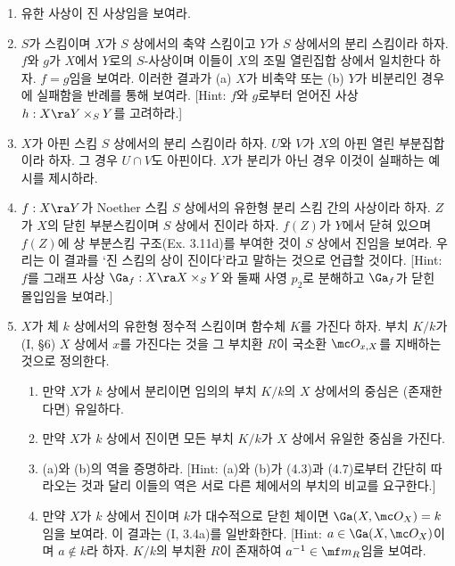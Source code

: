 	\begin{enumerate}[label=\tb{4.\arabic*.},itemindent=0mm,itemsep=2mm]
	\item 유한 사상이 진 사상임을 보여라.
	\item $S$가 스킴이며 $X$가 $S$ 상에서의 축약 스킴이고 $Y$가 $S$ 상에서의 분리 스킴이라 하자.
	$f$와 $g$가 $X$에서 $Y$로의 $S$-사상이며 이들이 $X$의 조밀 열린집합 상에서 일치한다 하자. $f=g$임을 보여라.
	이러한 결과가 (a) $X$가 비축약 또는 (b) $Y$가 비분리인 경우에 실패함을 반례를 통해 보여라.
	[Hint: $f$와 $g$로부터 얻어진 사상 $h:X\ra Y\times_SY$를 고려하라.]
	\item $X$가 아핀 스킴 $S$ 상에서의 분리 스킴이라 하자. $U$와 $V$가 $X$의 아핀 열린 부분집합이라 하자.
	그 경우 $U\cap V$도 아핀이다. $X$가 분리가 아닌 경우 이것이 실패하는 예시를 제시하라.
	\item $f:X\ra Y$가 Noether 스킴 $S$ 상에서의 유한형 분리 스킴 간의 사상이라 하자.
	$Z$가 $X$의 닫힌 부분스킴이며 $S$ 상에서 진이라 하자.
	$f(Z)$가 $Y$에서 닫혀 있으며 $f(Z)$에 상 부분스킴 구조(Ex. 3.11d)를 부여한 것이 $S$ 상에서 진임을 보여라.
	우리는 이 결과를 `진 스킴의 상이 진이다'라고 말하는 것으로 언급할 것이다.
	[Hint: $f$를 그래프 사상 $\Ga_f:X\ra X\times_SY$와 둘째 사영 $p_2$로 분해하고 $\Ga_f$가 닫힌 몰입임을 보여라.]
	\item $X$가 체 $k$ 상에서의 유한형 정수적 스킴이며 함수체 $K$를 가진다 하자.
	부치 $K/k$가 (I, \S 6) $X$ 상에서  $x$를 가진다는 것을
	그 부치환 $R$이 국소환 $\mc O_{x,X}$를 지배하는 것으로 정의한다.
	\begin{enumerate}[label=(\alph*)]
	\item 만약 $X$가 $k$ 상에서 분리이면 임의의 부치 $K/k$의 $X$ 상에서의 중심은 (존재한다면) 유일하다.
	\item 만약 $X$가 $k$ 상에서 진이면 모든 부치 $K/k$가 $X$ 상에서 유일한 중심을 가진다.
	\end{enumerate}
	\begin{enumerate}[label=*(\alph*)]
	\setcounter{enumii}{2}
	\item (a)와 (b)의 역을 증명하라. [Hint: (a)와 (b)가 (4.3)과 (4.7)로부터 간단히 따라오는 것과 달리
	이들의 역은 서로 다른 체에서의 부치의 비교를 요구한다.]
	\end{enumerate}
	\begin{enumerate}[label=(\alph*)]
	\setcounter{enumii}{3}
	\item 만약 $X$가 $k$ 상에서 진이며 $k$가 대수적으로 닫힌 체이면 $\Ga(X,\mc O_X)=k$임을 보여라. 이 결과는 (I, 3.4a)를 일반화한다.
	[Hint: $a\in\Ga(X,\mc O_X)$이며 $a\notin k$라 하자. $K/k$의 부치환 $R$이 존재하여 $a^{-1}\in\mf m_R$임을 보여라.

\end{enumerate}
\end{enumerate}

